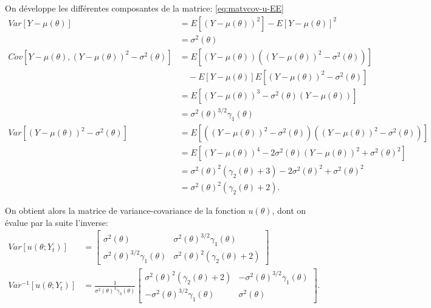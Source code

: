 On développe les différentes composantes de la matrice:
\eqref{eq:matvcov-u-EE}
\begin{align}
  \label{eq:18}
  Var\left[Y-\mu(\theta)\right] &= E\left[(Y-\mu(\theta))^2\right] -
  E\left[Y-\mu(\theta)\right]^2 \nonumber\\
  &=\sigma^2(\theta)\\
  Cov\left[Y-\mu(\theta),(Y-\mu(\theta))^2-\sigma^2(\theta) \right] &=
  E\left[\left(Y-\mu(\theta)\right)\left((Y-\mu(\theta))^2-\sigma^2(\theta)\right)
  \right] \nonumber\\ &\quad - E\left[Y-\mu(\theta) \right]
  E\left[(Y-\mu(\theta))^2-\sigma^2(\theta) \right] \nonumber\\
  &= E\left[(Y-\mu(\theta))^3 - \sigma^2(\theta)(Y-\mu(\theta))\right] \nonumber\\
  &= \sigma^2(\theta)^{3/2}\gamma_1(\theta)\\
  Var\left[(Y-\mu(\theta))^2-\sigma^2(\theta)\right] &=
  E\left[\left((Y-\mu(\theta))^2-\sigma^2(\theta)
    \right)\left((Y-\mu(\theta))^2-\sigma^2(\theta) \right) \right]\nonumber\\
  &= E\left[(Y-\mu(\theta))^4 - 2\sigma^2(\theta)(Y-\mu(\theta))^2 +
    \sigma^2(\theta)^2 \right] \nonumber\\
  &= \sigma^2(\theta)^2\left(\gamma_2(\theta)+3\right) - 2\sigma^2(\theta)^2 + \sigma^2(\theta)^2 \nonumber\\
  &=\sigma^2(\theta)^2\left(\gamma_2(\theta)+2 \right).
\end{align}

On obtient alors la matrice de variance-covariance de la fonction
$u(\theta)$, dont on évalue par la suite l'inverse:
\begin{align}
  \label{eq:19}
  Var\left[u(\theta;Y_t) \right] &= \begin{bmatrix}
    \sigma^2(\theta) & \sigma^2(\theta)^{3/2}\gamma_1(\theta)\\
    \sigma^2(\theta)^{3/2}\gamma_1(\theta) &
    \sigma^2(\theta)^2\left(\gamma_2(\theta)+2 \right)
  \end{bmatrix} \\
  Var^{-1}\left[u(\theta;Y_t) \right] &=
  \frac{1}{\sigma^2(\theta)^3\gamma_3(\theta)}\begin{bmatrix}
    \sigma^2(\theta)^2\left(\gamma_2(\theta)+2 \right) & -\sigma^2(\theta)^{3/2}\gamma_1(\theta)\\
    -\sigma^2(\theta)^{3/2}\gamma_1(\theta) & \sigma^2(\theta)
  \end{bmatrix}.
\end{align}


